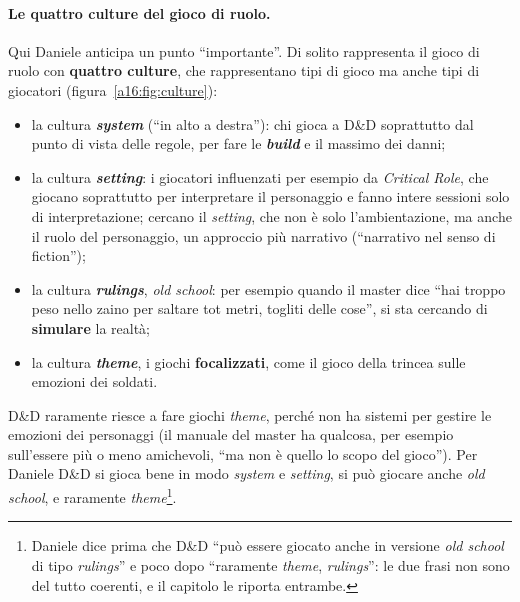 \paragraph{Le quattro culture del gioco di ruolo.} Qui Daniele anticipa un punto ``importante''. Di
solito rappresenta il gioco di ruolo con \textbf{quattro culture}, che rappresentano tipi di gioco
ma anche tipi di giocatori (figura~\ref{a16:fig:culture}):
\begin{itemize}
  \item la cultura \textbf{\emph{system}} (``in alto a destra''): chi gioca a D\&D soprattutto dal
        punto di vista delle regole, per fare le \textbf{\emph{build}} e il massimo dei danni;
  \item la cultura \textbf{\emph{setting}}: i giocatori influenzati per esempio da \emph{Critical
        Role}, che giocano soprattutto per interpretare il personaggio e fanno intere sessioni solo
        di interpretazione; cercano il \emph{setting}, che non è solo l'ambientazione, ma anche il
        ruolo del personaggio, un approccio più narrativo (``narrativo nel senso di fiction'');
  \item la cultura \textbf{\emph{rulings}}, \emph{old school}: per esempio quando il master dice
        ``hai troppo peso nello zaino per saltare tot metri, togliti delle cose'', si sta cercando
        di \textbf{simulare} la realtà;
  \item la cultura \textbf{\emph{theme}}, i giochi \textbf{focalizzati}, come il gioco della
        trincea sulle emozioni dei soldati.
\end{itemize}
D\&D raramente riesce a fare giochi \emph{theme}, perché non ha sistemi per gestire le emozioni dei
personaggi (il manuale del master ha qualcosa, per esempio sull'essere più o meno amichevoli, ``ma
non è quello lo scopo del gioco''). Per Daniele D\&D si gioca bene in modo \emph{system} e
\emph{setting}, si può giocare anche \emph{old school}, e raramente
\emph{theme}\footnote{Daniele dice prima che D\&D ``può essere giocato anche in versione
\emph{old school} di tipo \emph{rulings}'' e poco dopo ``raramente \emph{theme}, \emph{rulings}'':
le due frasi non sono del tutto coerenti, e il capitolo le riporta entrambe.}.

